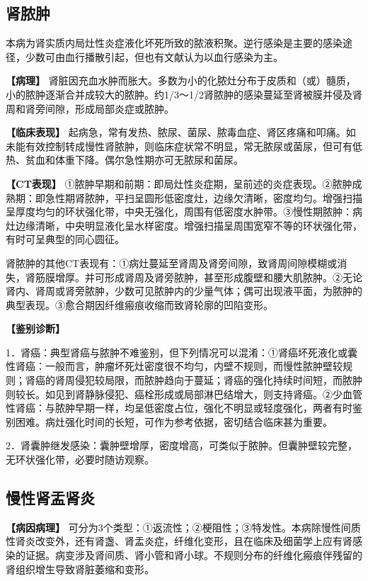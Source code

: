 \subsection{肾脓肿}

本病为肾实质内局灶性炎症液化坏死所致的脓液积聚。逆行感染是主要的感染途径，少数可由血行播散引起，但也有文献认为以血行感染为主。

\textbf{【病理】}
肾脏因充血水肿而胀大。多数为小的化脓灶分布于皮质和（或）髓质，小的脓肿逐渐合并成较大的脓肿。约1/3～1/2肾脓肿的感染蔓延至肾被膜并侵及肾周和肾旁间隙，形成局部炎症或脓肿。

\textbf{【临床表现】}
起病急，常有发热、脓尿、菌尿、脓毒血症、肾区疼痛和叩痛。如未能有效控制转成慢性肾脓肿，则临床症状常不明显，常无脓尿或菌尿，但可有低热、贫血和体重下降。偶尔急性期亦可无脓尿和菌尿。

\textbf{【CT表现】}
①脓肿早期和前期：即局灶性炎症期，呈前述的炎症表现。②脓肿成熟期：即急性期肾脓肿，平扫呈圆形低密度灶，边缘欠清晰，密度均匀。增强扫描呈厚度均匀的环状强化带，中央无强化，周围有低密度水肿带。③慢性期脓肿：病灶边缘清晰，中央明显液化呈水样密度。增强扫描呈周围宽窄不等的环状强化带，有时可呈典型的同心圆征。

肾脓肿的其他CT表现有：①病灶蔓延至肾周及肾旁间隙，致肾周间隙模糊或消失，肾筋膜增厚。并可形成肾周及肾旁脓肿，甚至形成腹壁和腰大肌脓肿。②无论肾内、肾周或肾旁脓肿，少数可见脓肿内的少量气体；偶可出现液平面，为脓肿的典型表现。③愈合期因纤维瘢痕收缩而致肾轮廓的凹陷变形。

\textbf{【鉴别诊断】}

1．肾癌：典型肾癌与脓肿不难鉴别，但下列情况可以混淆：①肾癌坏死液化或囊性肾癌：一般而言，肿瘤坏死灶密度很不均匀，内壁不规则，而慢性脓肿壁较规则；肾癌的肾周侵犯较局限，而脓肿趋向于蔓延；肾癌的强化持续时间短，而脓肿则较长。如见到肾静脉侵犯、癌栓形成或局部淋巴结增大，则支持肾癌。②少血管性肾癌：与脓肿早期一样，均呈低密度占位，强化不明显或轻度强化，两者有时鉴别困难。病灶强化时间的长短，可作为参考依据，密切结合临床甚为重要。

2．肾囊肿继发感染：囊肿壁增厚，密度增高，可类似于脓肿。但囊肿壁较完整，无环状强化带，必要时随访观察。

\subsection{慢性肾盂肾炎}

\textbf{【病因病理】}
可分为3个类型：①返流性；②梗阻性；③特发性。本病除慢性间质性肾炎改变外，还有肾盏、肾盂炎症，纤维化变形，且在临床及细菌学上应有肾感染的证据。病变涉及肾间质、肾小管和肾小球。不规则分布的纤维化瘢痕伴残留的肾组织增生导致肾脏萎缩和变形。

